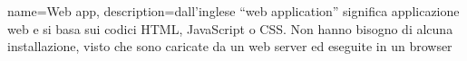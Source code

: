 {
	name={Web app},
	description={dall'inglese “web application” significa applicazione web e si basa sui codici HTML, JavaScript o CSS. Non hanno bisogno di alcuna installazione, visto che sono caricate da un web server ed eseguite in un browser}
}